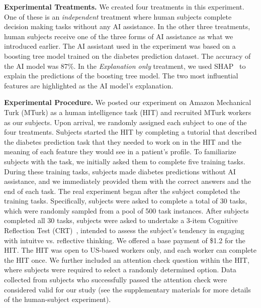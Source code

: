 \documentclass[letterpaper]{article} %
\begin{document}
\noindent \textbf{Experimental Treatments.} We created four treatments in this experiment. One of these is an \emph{independent} treatment where human subjects complete decision making tasks without any AI assistance.  In the other three treatments, human subjects receive one of the three forms of AI assistance as what we introduced earlier. The AI assistant used in the experiment was based on a boosting tree model trained on the diabetes prediction dataset. The accuracy of the AI model was 87\%.  In the \emph{Explanation only} treatment,  we used SHAP~\cite{lundberg2017unified} to explain the predictions of the boosting tree model. The two most influential features are highlighted as the AI model's explanation.

\noindent\textbf{Experimental Procedure.} We posted our experiment on Amazon Mechanical Turk (MTurk) as a human intelligence task (HIT) and recruited MTurk workers as our subjects. Upon arrival, we randomly assigned each subject to one of the four treatments.
Subjects started the HIT by completing a tutorial that described the diabetes prediction task that they needed to work on in the HIT and the meaning of each feature they would see in a patient’s profile. To familiarize subjects with the task, we initially asked them to complete five training tasks. During these training tasks, subjects made diabetes predictions without AI assistance, and we immediately provided them with the correct answers and the end of each task.
The real experiment began after the subject completed the training tasks. Specifically,  subjects were asked to complete a total of 30 tasks, which were randomly sampled from a pool of 500 task instances. After subjects completed all 30 tasks, subjects were asked to undertake a 3-item Cognitive Reflection Test (CRT)~\cite{Frederick2005CognitiveRA}, intended to assess the subject's tendency in engaging with intuitve vs. reflective thinking.
We offered a base payment of \$1.2 for the HIT. The HIT was open to US-based workers only, and each worker can complete the HIT once. We further included an attention check question within the HIT, where subjects were required to select a randomly determined option. Data collected from subjects who successfully passed the attention check were considered valid for our study (see the supplementary materials for more details of the human-subject experiment).
\end{document}

